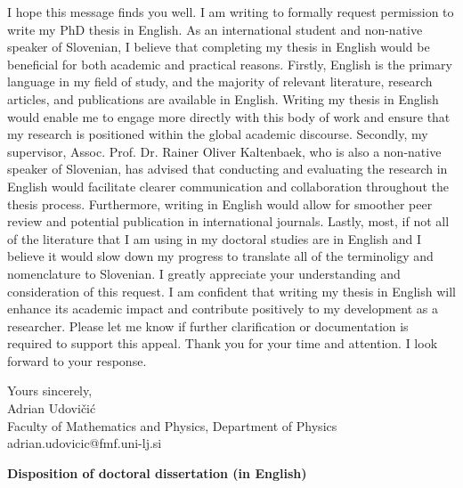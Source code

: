 \documentclass{article}
\begin{document}
I hope this message finds you well. I am writing to formally request permission
to write my PhD thesis in English. As an international student and non-native
speaker of Slovenian, I believe that completing my thesis in English would be
beneficial for both academic and practical reasons. Firstly, English is the
primary language in my field of study, and the majority of relevant literature,
research articles, and publications are available in English. Writing my thesis
in English would enable me to engage more directly with this body of work and
ensure that my research is positioned within the global academic discourse.
Secondly, my supervisor, Assoc. Prof. Dr. Rainer Oliver Kaltenbaek, who is also
a non-native speaker of Slovenian, has advised that conducting and evaluating
the research in English would facilitate clearer communication and
collaboration throughout the thesis process. Furthermore, writing in English
would allow for smoother peer review and potential publication in international
journals. Lastly, most, if not all of the literature that I am using in my
doctoral studies are in English and I believe it would slow down my progress to
translate all of the terminoligy and nomenclature to Slovenian. I greatly
appreciate your understanding and consideration of this request. I am confident
that writing my thesis in English will enhance its academic impact and
contribute positively to my development as a researcher. Please let me know if
further clarification or documentation is required to support this appeal.
Thank you for your time and attention. I look forward to your response.

\vspace{1cm} Yours sincerely,\\ Adrian Udovičić\\ Faculty of Mathematics and
Physics, Department of Physics\\ adrian.udovicic@fmf.uni-lj.si


\clearpage \pagestyle{plain}

\begin{center} \textbf{\Large Disposition of doctoral dissertation (in
		English)} \end{center}

\end{document}
